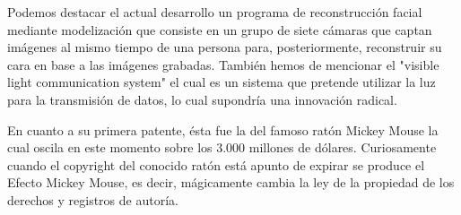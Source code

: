 Podemos destacar el actual desarrollo un programa de reconstrucción facial mediante modelización que consiste en un grupo de siete cámaras que captan imágenes al mismo tiempo de una persona para, posteriormente, reconstruir su cara en base a las imágenes grabadas. También hemos de mencionar el "visible light communication system" el cual es un sistema que pretende utilizar la luz para la transmisión de datos, lo cual supondría una innovación radical.

En cuanto a su primera patente, ésta fue la del famoso ratón Mickey Mouse la cual oscila en este momento sobre los 3.000 millones de dólares. Curiosamente cuando el copyright del conocido ratón está apunto de expirar se produce el Efecto Mickey Mouse, es decir, mágicamente cambia la ley de la propiedad de los derechos y registros de autoría.



